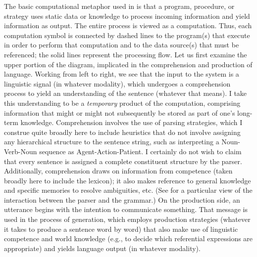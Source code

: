 The basic computational metaphor used in  is that a program, procedure, or strategy uses static data or knowledge to process incoming information and yield information as output. The entire process is viewed as a computation. Thus, each computation symbol is connected by dashed lines to the program(s) that execute in order to perform that computation and to the data source(s) that must be referenced; the solid lines represent the processing flow. Let us first examine the upper portion of the diagram, implicated in the comprehension and production of language. Working from left to right, we see that the input to the system is a linguistic signal (in whatever modality), which undergoes a comprehension process to yield an understanding of the sentence (whatever that means). I take this understanding to be a \textit{temporary} product of the computation, comprising information that might or might not subsequently be stored as part of one's long-term knowledge. Comprehension involves the use of parsing strategies, which I construe quite broadly here to include heuristics that do not involve assigning any hierarchical structure to the sentence string, such as interpreting a Noun-Verb-Noun sequence as Agent-Action-Patient. I certainly do not wish to claim that every sentence is assigned a complete constituent structure by the parser. Additionally, comprehension draws on information from competence
(taken broadly here to include the lexicon); it also makes reference to general knowledge and specific memories to resolve ambiguities, etc. (See \citet{BerwickEtAl1984} for a particular view of the interaction between the parser and the grammar.) On the production side, an utterance begins with the intention to communicate something. That message is used in the process of generation, which employs production strategies (whatever it takes to produce a sentence word by word) that also make use of linguistic competence and world knowledge (e.g., to decide which referential expressions are appropriate) and yields language output (in whatever modality).

